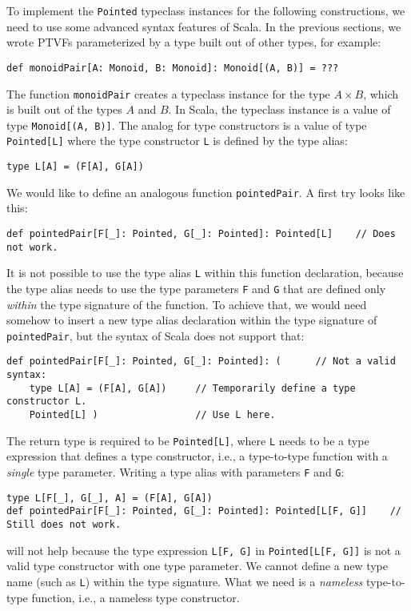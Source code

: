 To implement the \lstinline!Pointed! typeclass instances for the
following constructions, we need to use some advanced syntax features
of Scala. In the previous sections, we wrote PTVFs parameterized by
a type built out of other types, for example:
\begin{lstlisting}
def monoidPair[A: Monoid, B: Monoid]: Monoid[(A, B)] = ???
\end{lstlisting}
The function \lstinline!monoidPair! creates a typeclass instance
for the type $A\times B$, which is built out of the types $A$ and
$B$. In Scala, the typeclass instance is a value of type \lstinline!Monoid[(A, B)]!.
The analog for type constructors is a value of type \lstinline!Pointed[L]!
where the type constructor \lstinline!L! is defined by the type alias:
\begin{lstlisting}
type L[A] = (F[A], G[A])
\end{lstlisting}
We would like to define an analogous function \lstinline!pointedPair!.
A first try looks like this:
\begin{lstlisting}
def pointedPair[F[_]: Pointed, G[_]: Pointed]: Pointed[L]    // Does not work.
\end{lstlisting}
It is not possible to use the type alias \lstinline!L! within this
function declaration, because the type alias needs to use the type
parameters \lstinline!F! and \lstinline!G! that are defined only
\emph{within} the type signature of the function. To achieve that,
we would need somehow to insert a new type alias declaration within
the type signature of \lstinline!pointedPair!, but the syntax of
Scala does not support that:
\begin{lstlisting}
def pointedPair[F[_]: Pointed, G[_]: Pointed]: (      // Not a valid syntax:
    type L[A] = (F[A], G[A])     // Temporarily define a type constructor L.
    Pointed[L] )                 // Use L here.
\end{lstlisting}
The return type is required to be \lstinline!Pointed[L]!, where \lstinline!L!
needs to be a type expression that defines a type constructor, i.e.,
a type-to-type function with a \emph{single} type parameter. Writing
a type alias with parameters \lstinline!F! and \lstinline!G!:
\begin{lstlisting}
type L[F[_], G[_], A] = (F[A], G[A])
def pointedPair[F[_]: Pointed, G[_]: Pointed]: Pointed[L[F, G]]    // Still does not work.
\end{lstlisting}
will not help because the type expression \lstinline!L[F, G]! in
\lstinline!Pointed[L[F, G]]! is not a valid type constructor with
one type parameter. We cannot define a new type name (such as \lstinline!L!)
within the type signature. What we need is a \emph{nameless} type-to-type
function, i.e., a nameless type constructor.

